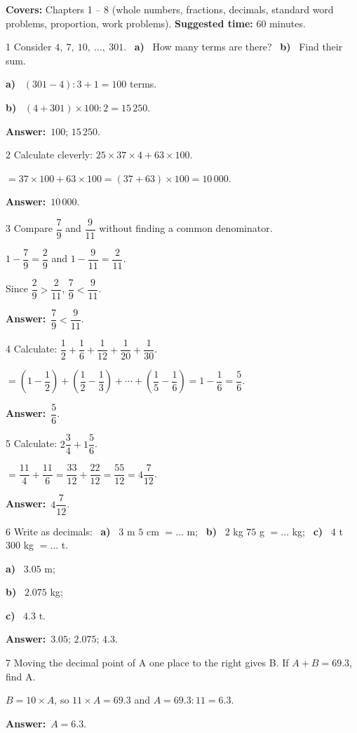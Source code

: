 \documentclass[11pt]{article}
\newif\ifsol \solfalse
\providecommand{\AnsWord}{Đáp số}
\newcommand{\dapso}[1]{\par\textbf{\AnsWord:}\ #1}
\newcommand{\probsol}[1]{%
  \begin{lrbox}{\solmeasure}\begin{minipage}{\dimexpr\linewidth-24pt\relax}#1\end{minipage}\end{lrbox}%
  \ifsol
    \begin{solbox}#1\end{solbox}%
  \else
    \setlength{\solht}{\dimexpr\ht\solmeasure+\dp\solmeasure+0.85cm\relax}%
    \ifdim\solht<1.35cm\setlength{\solht}{1.35cm}\fi
    \begin{tcolorbox}[colback=white,colframe=Line,boxrule=0.8pt,arc=5pt,
      left=8pt,right=8pt,top=4pt,bottom=4pt,height=\solht]{\footnotesize\color{Slate}\itshape\WorkWord}\end{tcolorbox}%
  \fi}
\newcommand{\pa}[1]{\textbf{#1)}\ }
\newcommand{\gap}{\vspace{0.3cm}}
\def\WorkWord{Your work:}
\def\AnsWord{Answer}
\begin{document}
\begin{knowbox}
\textbf{Covers:} Chapters 1 -- 8 (whole numbers, fractions, decimals, standard word problems, proportion, work problems). \quad \textbf{Suggested time:} $60$ minutes.
\end{knowbox}
\gap
\begin{probbox}{1}{\relax}
Consider $4,\ 7,\ 10,\ \ldots,\ 301$. \ \pa{a} How many terms are there? \ \pa{b} Find their sum.
\end{probbox}
\probsol{
\pa{a} $(301-4):3+1=100$ terms.\par \pa{b} $(4+301)\times100:2=15\,250$.
\dapso{$100$; $15\,250$.}}
\gap
\begin{probbox}{2}{\relax}
Calculate cleverly: $25\times37\times4+63\times100$.
\end{probbox}
\probsol{
$=37\times100+63\times100=(37+63)\times100=10\,000$.
\dapso{$10\,000$.}}
\gap
\begin{probbox}{3}{\relax}
Compare $\dfrac79$ and $\dfrac9{11}$ without finding a common denominator.
\end{probbox}
\probsol{
$1-\dfrac79=\dfrac29$ and $1-\dfrac9{11}=\dfrac2{11}$.\par Since $\dfrac29>\dfrac2{11}$, $\dfrac79<\dfrac9{11}$.
\dapso{$\dfrac79<\dfrac9{11}$.}}
\gap
\begin{probbox}{4}{\relax}
Calculate: $\dfrac12+\dfrac16+\dfrac1{12}+\dfrac1{20}+\dfrac1{30}$.
\end{probbox}
\probsol{
$=\left(1-\dfrac12\right)+\left(\dfrac12-\dfrac13\right)+\cdots+\left(\dfrac15-\dfrac16\right)=1-\dfrac16=\dfrac56$.
\dapso{$\dfrac56$.}}
\gap
\begin{probbox}{5}{\relax}
Calculate: $2\dfrac34+1\dfrac56$.
\end{probbox}
\probsol{
$=\dfrac{11}4+\dfrac{11}6=\dfrac{33}{12}+\dfrac{22}{12}=\dfrac{55}{12}=4\dfrac7{12}$.
\dapso{$4\dfrac7{12}$.}}
\gap
\begin{probbox}{6}{\relax}
Write as decimals: \ \pa{a} $3$ m $5$ cm $=\ldots$ m; \ \pa{b} $2$ kg $75$ g $=\ldots$ kg; \ \pa{c} $4$ t $300$ kg $=\ldots$ t.
\end{probbox}
\probsol{
\pa{a} $3.05$ m;\par \pa{b} $2.075$ kg;\par \pa{c} $4.3$ t.
\dapso{$3.05$; $2.075$; $4.3$.}}
\gap
\begin{probbox}{7}{\relax}
Moving the decimal point of A one place to the right gives B. If $A+B=69.3$, find A.
\end{probbox}
\probsol{
$B=10\times A$, so $11\times A=69.3$ and $A=69.3:11=6.3$.
\dapso{$A=6.3$.}}
\end{document}
